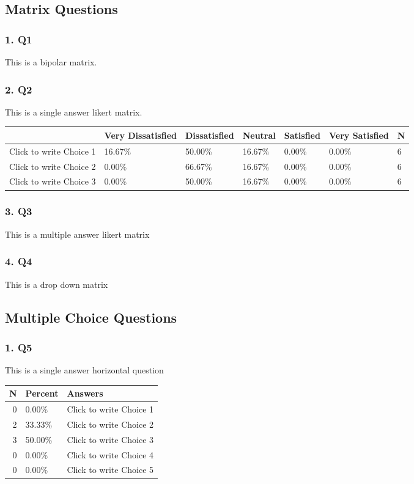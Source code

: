 \documentclass{article}\usepackage[]{graphicx}\usepackage[]{color}
\begin{document}
\subsection*{Matrix Questions}
\subsubsection*{1. Q1}
This is a bipolar matrix.

\hfill \break \hfill \break
\subsubsection*{2. Q2}
This is a single answer likert matrix.

\begin{tabular}{l|l|l|l|l|l|l}
\hline
 & Very Dissatisfied & Dissatisfied  & Neutral & Satisfied & Very Satisfied & N\\
\hline
Click to write Choice 1 & 16.67\% & 50.00\% & 16.67\% & 0.00\% & 0.00\% & 6\\
\hline
Click to write Choice 2 & 0.00\% & 66.67\% & 16.67\% & 0.00\% & 0.00\% & 6\\
\hline
Click to write Choice 3 & 0.00\% & 50.00\% & 16.67\% & 0.00\% & 0.00\% & 6\\
\hline
\end{tabular}


\hfill \break \hfill \break
\subsubsection*{3. Q3}
This is a multiple answer likert matrix

\hfill \break \hfill \break
\subsubsection*{4. Q4}
This is a drop down matrix

\hfill \break \hfill \break
\subsection*{Multiple Choice Questions}
\subsubsection*{1. Q5}
This is a single answer horizontal question

\begin{tabular}{r|l|l}
\hline
N & Percent & Answers\\
\hline
0 & 0.00\% & Click to write Choice 1\\
\hline
2 & 33.33\% & Click to write Choice 2\\
\hline
3 & 50.00\% & Click to write Choice 3\\
\hline
0 & 0.00\% & Click to write Choice 4\\
\hline
0 & 0.00\% & Click to write Choice 5\\
\hline
\end{tabular}
\end{document}
